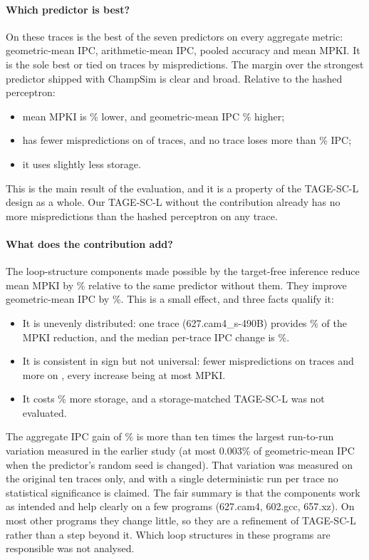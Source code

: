\paragraph{Which predictor is best?} On these  traces \prop{} is the best of the seven predictors on every aggregate metric: geometric-mean IPC, arithmetic-mean IPC, pooled accuracy and mean MPKI. It is the sole best or tied on  traces by mispredictions. The margin over the strongest predictor shipped with ChampSim is clear and broad. Relative to the hashed perceptron:
\begin{itemize}
\item mean MPKI is \% lower, and geometric-mean IPC \% higher;
\item \prop{} has fewer mispredictions on  of  traces, and no trace loses more than \% IPC;
\item it uses slightly less storage.
\end{itemize}
This is the main result of the evaluation, and it is a property of the TAGE-SC-L design as a whole. Our TAGE-SC-L without the contribution already has no more mispredictions than the hashed perceptron on any trace.

\paragraph{What does the contribution add?} The loop-structure components made possible by the target-free inference reduce mean MPKI by \% relative to the same predictor without them. They improve geometric-mean IPC by \%. This is a small effect, and three facts qualify it:
\begin{itemize}
\item It is unevenly distributed: one trace (627.cam4\_s-490B) provides \% of the MPKI reduction, and the median per-trace IPC change is \%.
\item It is consistent in sign but not universal: fewer mispredictions on  traces and more on , every increase being at most  MPKI.
\item It costs \% more storage, and a storage-matched TAGE-SC-L was not evaluated.
\end{itemize}
The aggregate IPC gain of \% is more than ten times the largest run-to-run variation measured in the earlier study (at most 0.003\% of geometric-mean IPC when the predictor's random seed is changed). That variation was measured on the original ten traces only, and with a single deterministic run per trace no statistical significance is claimed. The fair summary is that the components work as intended and help clearly on a few programs (627.cam4, 602.gcc, 657.xz). On most other programs they change little, so they are a refinement of TAGE-SC-L rather than a step beyond it. Which loop structures in these programs are responsible was not analysed.

